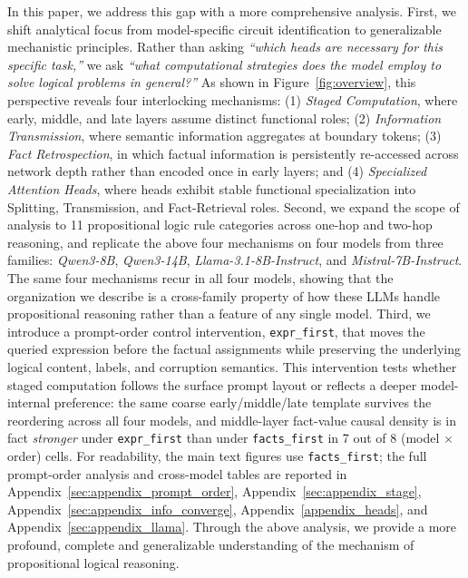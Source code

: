 \documentclass[11pt]{article}
\begin{document}
In this paper, we address this gap with a more comprehensive analysis.
First, we shift analytical focus from model-specific circuit identification to generalizable mechanistic principles. Rather than asking \textit{``which heads are necessary for this specific task,''} we ask \textit{``what computational strategies does the model employ to solve logical problems in general?''} As shown in Figure~\ref{fig:overview}, this perspective reveals four interlocking mechanisms: (1) \textit{Staged Computation}, where early, middle, and late layers assume distinct functional roles; (2) \textit{Information Transmission}, where semantic information aggregates at boundary tokens; (3) \textit{Fact Retrospection}, in which factual information is persistently re-accessed across network depth rather than encoded once in early layers; and (4) \textit{Specialized Attention Heads}, where heads exhibit stable functional specialization into Splitting, Transmission, and Fact-Retrieval roles.
%
Second, we expand the scope of analysis to 11 propositional logic rule categories across one-hop and two-hop reasoning, and replicate the above four mechanisms on four models from three families: \textit{Qwen3-8B}, \textit{Qwen3-14B}, \textit{Llama-3.1-8B-Instruct}, and \textit{Mistral-7B-Instruct}. The same four mechanisms recur in all four models, showing that the organization we describe is a cross-family property of how these LLMs handle propositional reasoning rather than a feature of any single model.
%
Third, we introduce a prompt-order control intervention, \texttt{expr\_first}, that moves the queried expression before the factual assignments while preserving the underlying logical content, labels, and corruption semantics. This intervention tests whether staged computation follows the surface prompt layout or reflects a deeper model-internal preference: the same coarse early/middle/late template survives the reordering across all four models, and middle-layer fact-value causal density is in fact \emph{stronger} under \texttt{expr\_first} than under \texttt{facts\_first} in 7 out of 8 (model $\times$ order) cells. For readability, the main text figures use \texttt{facts\_first}; the full prompt-order analysis and cross-model tables are reported in Appendix~\ref{sec:appendix_prompt_order}, Appendix~\ref{sec:appendix_stage}, Appendix~\ref{sec:appendix_info_converge}, Appendix~\ref{appendix_heads}, and Appendix~\ref{sec:appendix_llama}.
Through the above analysis, we provide a more profound, complete and generalizable understanding of the mechanism of propositional logical reasoning. 
\end{document}
